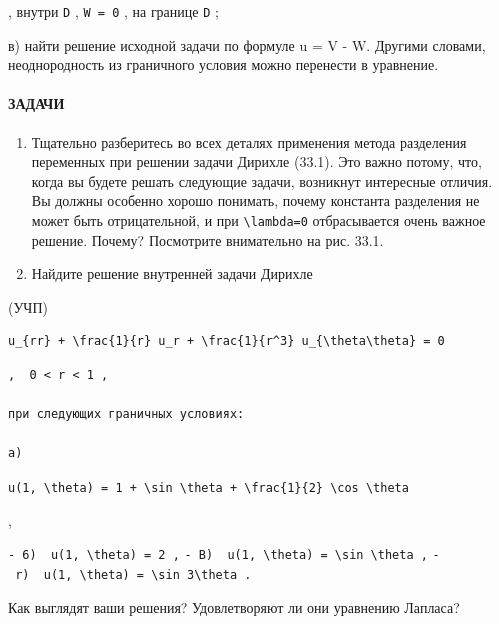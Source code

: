 \documentclass[
  ukrainian,
]{article}
\begin{document}
, внутри \texttt{D} , \texttt{W\ =\ 0} , на границе \texttt{D} ;

в) найти решение исходной задачи по формуле u = V - W. Другими словами,
неоднородность из граничного условия можно перенести в уравнение.

\paragraph{ЗАДАЧИ}\label{ux437ux430ux434ux430ux447ux438-3}

\begin{enumerate}
\def\labelenumi{\arabic{enumi}.}
\item
  Тщательно разберитесь во всех деталях применения метода разделения
  переменных при решении задачи Дирихле (33.1). Это важно потому, что,
  когда вы будете решать следующие задачи, возникнут интересные отличия.
  Вы должны особенно хорошо понимать, почему константа разделения не
  может быть отрицательной, и при \texttt{\textbackslash{}lambda=0}
  отбрасывается очень важное решение. Почему? Посмотрите внимательно на
  рис. 33.1.
\item
  Найдите решение внутренней задачи Дирихле
\end{enumerate}

(УЧП)

\begin{verbatim}
u_{rr} + \frac{1}{r} u_r + \frac{1}{r^3} u_{\theta\theta} = 0
\end{verbatim}

\begin{verbatim}
,  0 < r < 1 ,

при следующих граничных условиях:

a)
\end{verbatim}

\texttt{u(1,\ \textbackslash{}theta)\ =\ 1\ +\ \textbackslash{}sin\ \textbackslash{}theta\ +\ \textbackslash{}frac\{1\}\{2\}\ \textbackslash{}cos\ \textbackslash{}theta}

,

\texttt{-\ 6)\ \ \textquotesingle{}u(1,\ \textbackslash{}theta)\ =\ 2\textquotesingle{}\ ,}
\texttt{-\ B)\ \ \textquotesingle{}u(1,\ \textbackslash{}theta)\ =\ \textbackslash{}sin\ \textbackslash{}theta\textquotesingle{}\ ,}
\texttt{-\ r)\ \ \textquotesingle{}u(1,\ \textbackslash{}theta)\ =\ \textbackslash{}sin\ 3\textbackslash{}theta\textquotesingle{}\ .}

Как выглядят ваши решения? Удовлетворяют ли они уравнению Лапласа?
\end{document}
